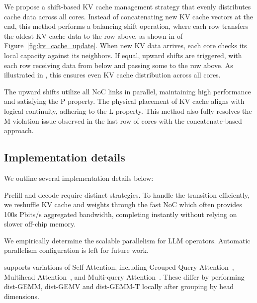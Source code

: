  We propose a shift-based KV cache management strategy that evenly distributes cache data across all cores. Instead of concatenating new KV cache vectors at the end, this method performs a balancing shift operation, where each row transfers the oldest KV cache data to the row above, as shown in  of Figure~\ref{fig:kv_cache_update}. When new KV data arrives, each core checks its local capacity against its neighbors. If equal, upward shifts are triggered, with each row receiving data from below and passing some to the row above. As illustrated in , this ensures even KV cache distribution across all cores.

The upward shifts utilize all NoC links in parallel, maintaining high performance and satisfying the P property. The physical placement of KV cache aligns with logical continuity, adhering to the L property. This method also fully resolves the M violation issue observed in the last row of cores with the concatenate-based approach.

    \vspace{-3mm}
\subsection{Implementation details}
    \vspace{-1mm}

We outline several implementation details below:

 Prefill and decode require distinct strategies. To handle the transition efficiently, we reshuffle KV cache and weights through the fast NoC which often provides 100s Pbits/s aggregated bandwidth, completing instantly without relying on slower off-chip memory.

 We empirically determine the scalable parallelism for LLM operators. Automatic parallelism configuration is left for future work.

 \sys supports variations of Self-Attention, including Grouped Query Attention~\cite{gqa}, Multihead Attention~\cite{mha}, and Multi-query Attention~\cite{mqa}. These differ by performing dist-GEMM, dist-GEMV and dist-GEMM-T locally after grouping by head dimensions.


